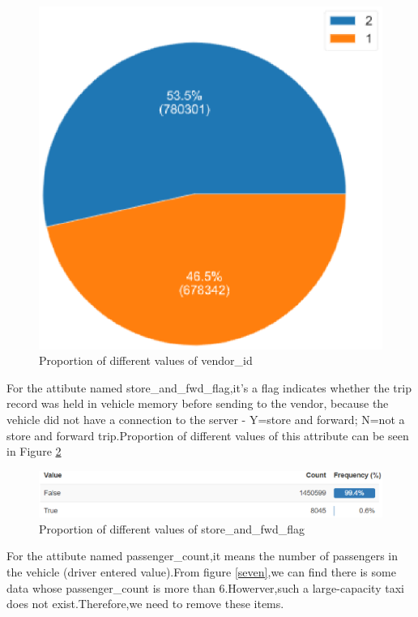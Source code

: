 \begin{figure}[htbp]
	\centering
	\includegraphics[scale=0.4]{figures/three.eps}
	\caption{Proportion of different values of vendor\_id} \label{three}
\end{figure} 
\par For the attibute named store\_and\_fwd\_flag,it's a flag indicates whether the trip record was held in vehicle memory before sending to the vendor, because the vehicle did not have a connection to the server - Y=store and forward; N=not a store and forward trip.Proportion of different values of this attribute can be seen in Figure \ref{four}
\begin{figure}[htbp]
	\centering
	\includegraphics[scale=0.4]{figures/four.eps}
	\caption{Proportion of different values of store\_and\_fwd\_flag} \label{four}
\end{figure} 
\par For the attibute named passenger\_count,it means the number of passengers in the vehicle (driver entered value).From figure \ref{seven},we can find there is some data whose passenger\_count is more than 6.Howerver,such a large-capacity taxi does not exist.Therefore,we need to remove these items.
